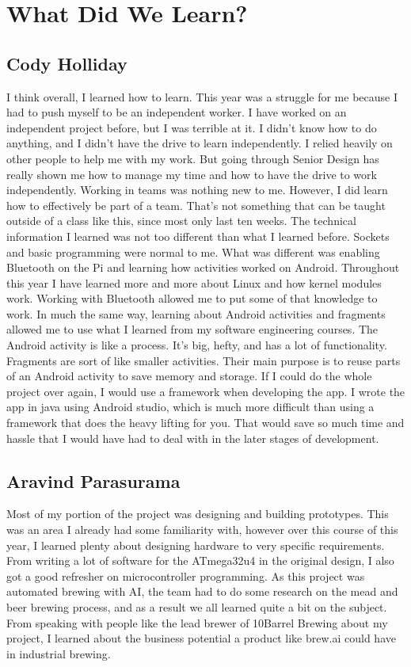 \section{What Did We Learn?}
\subsection{Cody Holliday}
I think overall, I learned how to learn. This year was a struggle for me because I had to push myself to be an independent worker.
I have worked on an independent project before, but I was terrible at it.
I didn't know how to do anything, and I didn't have the drive to learn independently.
I relied heavily on other people to help me with my work.
But going through Senior Design has really shown me how to manage my time and how to have the drive to work independently.
Working in teams was nothing new to me. However, I did learn how to effectively be part of a team.
That's not something that can be taught outside of a class like this, since most only last ten weeks.
The technical information I learned was not too different than what I learned before.
Sockets and basic programming were normal to me. What was different was enabling Bluetooth on the Pi and learning how activities worked on Android.
Throughout this year I have learned more and more about Linux and how kernel modules work.
Working with Bluetooth allowed me to put some of that knowledge to work.
In much the same way, learning about Android activities and fragments allowed me to use what I learned from my software engineering courses.
The Android activity is like a process. It's big, hefty, and has a lot of functionality.
Fragments are sort of like smaller activities. Their main purpose is to reuse parts of an Android activity to save memory and storage.
If I could do the whole project over again, I would use a framework when developing the app.
I wrote the app in java using Android studio, which is much more difficult than using a framework that does the heavy lifting for you.
That would save so much time and hassle that I would have had to deal with in the later stages of development.

\subsection{Aravind Parasurama}
Most of my portion of the project was designing and building prototypes. This was an area I already had some familiarity with, however over this course
of this year, I learned plenty about designing hardware to very specific requirements. From writing a lot of software for the ATmega32u4 in the original design,
I also got a good refresher on microcontroller programming. As this project was automated brewing with AI, the team had to do some research on the mead and beer
brewing process, and as a result we all learned quite a bit on the subject. From speaking with people like the lead brewer of 10Barrel Brewing about my project,
I learned about the business potential a product like brew.ai could have in industrial brewing.

